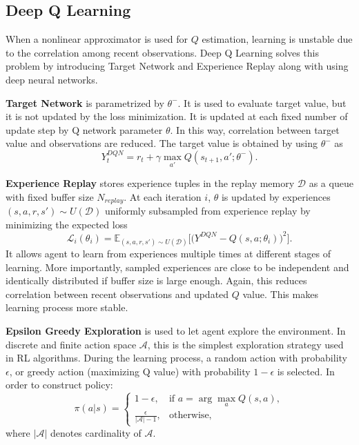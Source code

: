 \documentclass[a4paper, 12pt]{article} %
\begin{document}
\subsection{Deep Q Learning}
When a nonlinear approximator is used for $Q$ estimation, learning is unstable due to the correlation among recent observations. 
Deep Q Learning solves this problem by introducing Target Network and Experience Replay \cite{mnih_human-level_2015, mnih_playing_2013} along with using deep neural networks. 

\textbf{Target Network} is parametrized by $\theta^-$. 
It is used to evaluate target value, but it is not updated by the loss minimization. 
It is updated at each fixed number of update step by Q network parameter $\theta$. 
In this way, correlation between target value and observations are reduced.
The target value is obtained by using $\theta^-$ as
\begin{equation}
\label{eqn:dqn_ntarget}
Y_t^{DQN} = r_t + \gamma \max_{a'} Q(s_{t+1},a';\theta^-).
\end{equation}

\textbf{Experience Replay} stores experience tuples in the replay memory $\mathcal{D}$ as a queue with fixed buffer size $N_{replay}$. 
At each iteration $i$, $\theta$ is updated by experiences $(s,a,r,s')\sim U(\mathcal{D})$ uniformly subsampled from experience replay by minimizing the expected loss
\begin{equation}
\label{eqn:dqn_loss}
\mathcal{L}_i(\theta_i) = \mathbb{E}_{(s,a,r,s')\sim U(\mathcal{D})}\Big[\big( Y^{DQN} - Q(s,a;\theta_i) \big) ^ 2 \Big].
\end{equation}
It allows agent to learn from experiences multiple times at different stages of learning. 
More importantly, sampled experiences are close to be independent and identically distributed if buffer size is large enough. 
Again, this reduces correlation between recent observations and updated $Q$ value. This makes learning process more stable. 

\textbf{Epsilon Greedy Exploration} is used to let agent explore the environment. 
In discrete and finite action space $\mathcal{A}$, this is the simplest exploration strategy used in RL algorithms.
During the learning process, a random action with probability $\epsilon$, or greedy action (maximizing Q value) with probability $1-\epsilon$ is selected. 
In order to construct policy:   
\begin{equation}
\label{eqn:egreedy_policy}
\pi(a|s) = 
\begin{cases}
1-\epsilon,   & \text{if } a = \arg \max_{a} Q(s, a), \\
\displaystyle\frac{\epsilon}{|\mathcal{A}|-1},     & \text{otherwise},
\end{cases}
\end{equation}
where $|\mathcal{A}|$ denotes cardinality of $\mathcal{A}$. 
\end{document}
